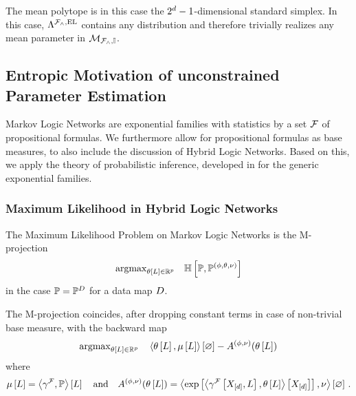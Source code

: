 \begin{example}
	The mean polytope is in this case the $2^d-1$-dimensional standard simplex.
	In this case, $\Lambda^{\mathcal{F}_{\land},\mathrm{EL}}$ contains any distribution and therefore trivially realizes any mean parameter in $\mathcal{M}_{\mathcal{F}_{\land},\mathbb{I}}$.
\end{example}



\subsection{Entropic Motivation of unconstrained Parameter Estimation} \label{sec:parameterEstimation} %

Markov Logic Networks are exponential families with statistics by a set $\mathcal{F}$ of propositional formulas.
We furthermore allow for propositional formulas as base measures, to also include the discussion of Hybrid Logic Networks.
Based on this, we apply the theory of probabilistic inference, developed in  for the generic exponential families.

\subsubsection{Maximum Likelihood in Hybrid Logic Networks}

The Maximum Likelihood Problem on Markov Logic Networks is the M-projection
\begin{align*}
	\mathrm{argmax}_{\theta\left[L\right]\in\mathbb{R}^{p}} \quad 
	\mathbb{H}\left[\mathbb{P},\mathbb{P}^{(\phi,\theta,\nu)}\right]	
\end{align*}
in the case $\mathbb{P}=\mathbb{P}^{D}$ for a data map $D$.

The M-projection coincides, after dropping constant terms in case of non-trivial base measure, with the backward map
\begin{align*}
	\mathrm{argmax}_{\theta\left[L\right]\in\mathbb{R}^{p}} \quad 
	\left\langle \theta\left[L\right],\mu\left[L\right]\right\rangle \left[ \varnothing \right] - A^{(\phi,\nu)}(\theta\left[L\right]) 
\end{align*}
where
\begin{align*}
	\mu\left[L\right] 
	= \left\langle \gamma^{\mathcal{F}},\mathbb{P}\right\rangle \left[ L \right] 
	\quad \text{and} \quad
	A^{(\phi,\nu)}(\theta\left[L\right]) 
	= \left\langle \mathrm{exp}\left[ \left\langle \gamma^{\mathcal{F}}\left[X_{[d]},L\right],\theta\left[L\right]\right\rangle \left[ X_{[d]} \right] \right], \nu\right\rangle \left[ \varnothing \right] \, . 
\end{align*}

